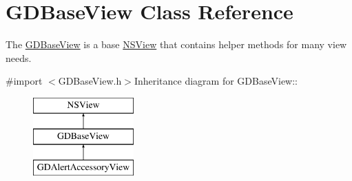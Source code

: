 \hypertarget{interface_g_d_base_view}{
\section{GDBaseView Class Reference}
\label{interface_g_d_base_view}
}


The \hyperlink{interface_g_d_base_view}{GDBaseView} is a base \hyperlink{class_n_s_view}{NSView} that contains helper methods for many view needs.  


{\ttfamily \#import $<$GDBaseView.h$>$}Inheritance diagram for GDBaseView::\begin{figure}[H]
\begin{center}
\leavevmode
\includegraphics[height=3cm]{interface_g_d_base_view}
\end{center}
\end{figure}
